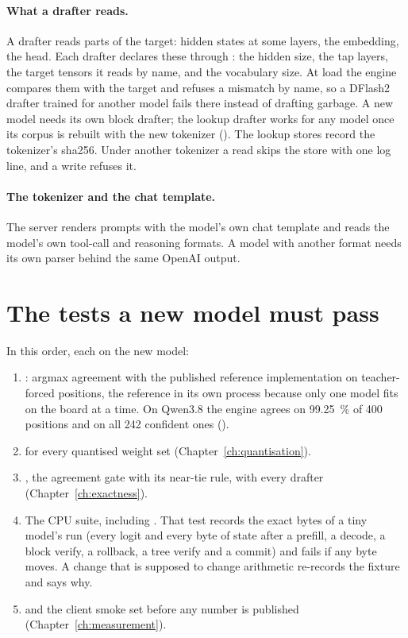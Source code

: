 \paragraph{What a drafter reads.} A drafter reads parts of the target: hidden states at some layers, the embedding, the head. Each drafter declares these through : the hidden size, the tap layers, the target tensors it reads by name, and the vocabulary size. At load the engine compares them with the target and refuses a mismatch by name, so a DFlash2 drafter trained for another model fails there instead of drafting garbage. A new model needs its own block drafter; the lookup drafter works for any model once its corpus is rebuilt with the new tokenizer (). The lookup stores record the tokenizer's sha256. Under another tokenizer a read skips the store with one log line, and a write refuses it.

\paragraph{The tokenizer and the chat template.} The server renders prompts with the model's own chat template and reads the model's own tool-call and reasoning formats. A model with another format needs its own parser behind the same OpenAI output.

\section{The tests a new model must pass}

In this order, each on the new model:

\begin{enumerate}
\item {}: argmax agreement with the published reference implementation on teacher-forced positions, the reference in its own process because only one model fits on the board at a time. On Qwen3.8 the engine agrees on 99.25~\% of 400 positions and on all 242 confident ones (\measured).
\item {} for every quantised weight set (Chapter~\ref{ch:quantisation}).
\item {}, the agreement gate with its near-tie rule, with every drafter (Chapter~\ref{ch:exactness}).
\item The CPU suite, including . That test records the exact bytes of a tiny model's run (every logit and every byte of state after a prefill, a decode, a block verify, a rollback, a tree verify and a commit) and fails if any byte moves. A change that is supposed to change arithmetic re-records the fixture and says why.
\item {} and the client smoke set before any number is published (Chapter~\ref{ch:measurement}).
\end{enumerate}

